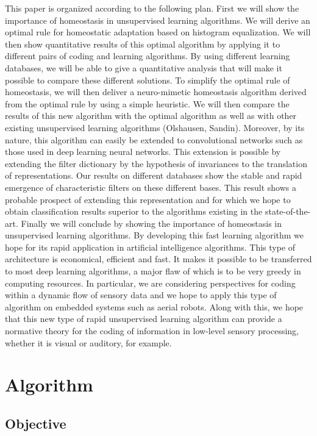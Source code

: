 \documentclass[a4paper, 11pt]{article} %
\begin{document}
This paper is organized according to the following plan. First we will
show the importance of homeostasis in unsupervised learning algorithms.
We will derive an optimal rule for homeostatic adaptation based on
histogram equalization. We will then show quantitative results of this
optimal algorithm by applying it to different pairs of coding and
learning algorithms. By using different learning databases, we will be
able to give a quantitative analysis that will make it possible to
compare these different solutions. To simplify the optimal rule of
homeostasis, we will then deliver a neuro-mimetic homeostasis algorithm
derived from the optimal rule by using a simple heuristic. We will then
compare the results of this new algorithm with the optimal algorithm as
well as with other existing unsupervised learning algorithms (Olshausen,
Sandin). Moreover, by its nature, this algorithm can easily be extended
to convolutional networks such as those used in deep learning neural
networks. This extension is possible by extending the filter dictionary
by the hypothesis of invariances to the translation of representations.
Our results on different databases show the stable and rapid emergence
of characteristic filters on these different bases. This result shows a
probable prospect of extending this representation and for which we hope
to obtain classification results superior to the algorithms existing in
the state-of-the-art. Finally we will conclude by showing the importance
of homeostasis in unsupervised learning algorithms. By developing this
fast learning algorithm we hope for its rapid application in artificial
intelligence algorithms. This type of architecture is economical,
efficient and fast. It makes it possible to be transferred to most deep
learning algorithms, a major flaw of which is to be very greedy in
computing resources. In particular, we are considering perspectives for
coding within a dynamic flow of sensory data and we hope to apply this
type of algorithm on embedded systems such as aerial robots. Along with
this, we hope that this new type of rapid unsupervised learning
algorithm can provide a normative theory for the coding of information
in low-level sensory processing, whether it is visual or auditory, for
example.

\section{Algorithm}\label{algorithm}




\subsection{Objective}\label{objective}
\end{document}
